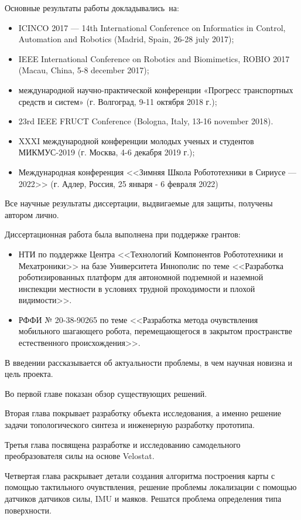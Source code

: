 {\probation}
Основные результаты работы докладывались~на:
\begin{itemize}
  \item ICINCO 2017 --- 14th International Conference on Informatics in Control, Automation and Robotics (Madrid, Spain, 26-28 july 2017);
  \item IEEE International Conference on Robotics and Biomimetics, ROBIO 2017 (Macau, China, 5-8 december 2017);
  \item  международной  научно-практической  конференции  «Прогресс  транспортных 
  средств и систем» (г. Волгоград, 9-11 октября 2018 г.);
  \item 23rd IEEE FRUCT Conference (Bologna, Italy, 13-16 november 2018).
  \item XXXI международной конференции молодых ученых и студентов МИКМУС-2019 
  (г. Москва, 4-6 декабря 2019 г.);
  \item Международная конференция <<Зимняя Школа Робототехники в Сириусе --- 2022>> (г. Адлер, Россия, 25 января - 6 февраля 2022)
\end{itemize}

{\contribution} Все научные результаты диссертации, выдвигаемые для защиты, получены автором лично.



Диссертационная работа была выполнена при поддержке грантов:
\begin{itemize}
    \item НТИ по поддержке Центра <<Технологий Компонентов Робототехники и Мехатроники>> на базе Университета Иннополис по теме <<Разработка роботизированных платформ для автономной подземной и наземной инспекции местности в условиях трудной проходимости и плохой видимости>>. 
    \item РФФИ № 20-38-90265 по теме <<Разработка метода очувствления мобильного шагающего робота, перемещающегося в закрытом пространстве естественного происхождения>>.
\end{itemize}

{\struct}
В введении рассказывается об актуальности проблемы, в чем научная новизна и цель проекта.

Во первой главе показан обзор существующих решений.

Вторая глава покрывает разработку объекта исследования, а именно решение задачи топологического синтеза и инженерную разработку прототипа.

Третья глава посвящена разработке и исследованию самодельного преобразователя силы на основе Velostat.

Четвертая глава раскрывает детали создания алгоритма построения карты с помощью тактильного очувствления, решение проблемы локализации с помощью датчиков датчиков силы, IMU и маяков. Решатся проблема определения типа поверхности.